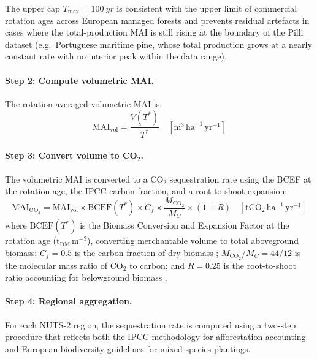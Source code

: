 \documentclass[12pt, a4paper]{article}
\begin{document}
The upper cap $T_\text{max} = \SI{100}{yr}$ is consistent with the upper limit of
commercial rotation ages across European managed forests and prevents residual artefacts
in cases where the total-production MAI is still rising at the boundary of the Pilli
dataset (e.g.\ Portuguese maritime pine, whose total production grows at a nearly
constant rate with no interior peak within the data range).

\paragraph{Step 2: Compute volumetric MAI.}
The rotation-averaged volumetric MAI is:
\begin{equation}
    \text{MAI}_\text{vol} = \frac{V(T^*)}{T^*}
    \quad [\text{m}^3\,\text{ha}^{-1}\,\text{yr}^{-1}]
    \label{eq:mai_vol}
\end{equation}

\paragraph{Step 3: Convert volume to CO$_2$.}
The volumetric MAI is converted to a CO$_2$ sequestration rate using the BCEF
at the rotation age, the IPCC carbon fraction, and a root-to-shoot expansion:
\begin{equation}
    \text{MAI}_{\text{CO}_2} = \text{MAI}_\text{vol}
        \times \text{BCEF}(T^*)
        \times C_f
        \times \frac{M_{\text{CO}_2}}{M_C}
        \times (1 + R)
    \quad [\text{tCO}_2\,\text{ha}^{-1}\,\text{yr}^{-1}]
    \label{eq:mai_co2}
\end{equation}
where $\text{BCEF}(T^*)$ is the Biomass Conversion and Expansion Factor at
the rotation age (t$_\text{DM}$\,m$^{-3}$), converting merchantable volume
to total aboveground biomass; $C_f = 0.5$ is the carbon fraction of dry
biomass \citep{IPCC2006}; $M_{\text{CO}_2}/M_C = 44/12$ is
the molecular mass ratio of CO$_2$ to carbon; and $R = 0.25$ is the
root-to-shoot ratio accounting for belowground biomass
\citep{IPCC2006, Mokany2006}.

\paragraph{Step 4: Regional aggregation.}
For each NUTS-2 region, the sequestration rate is computed using a two-step
procedure that reflects both the IPCC methodology for afforestation accounting
and European biodiversity guidelines for mixed-species plantings.
\end{document}
